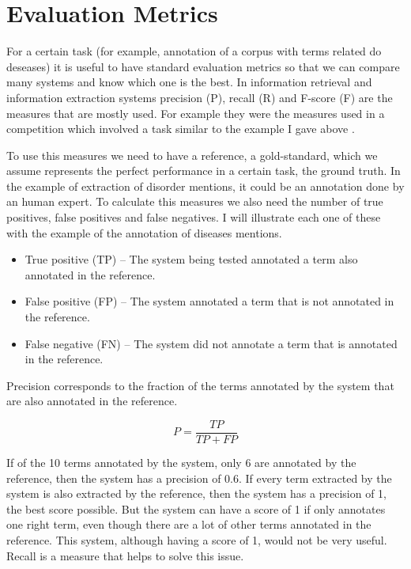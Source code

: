 \section{Evaluation Metrics}
\label{Evaluation Metrics}

For a certain task (for example, annotation of a corpus with terms related do deseases) it is useful to have standard evaluation metrics so that we can compare many systems and know which one is the best. In information retrieval and information extraction systems precision (P), recall (R) and F-score (F) are the measures that are mostly used. For example they were the measures used in a competition which involved a task similar to the example I gave above \citep{Elhadad2015}.

To use this measures we need to have a reference, a gold-standard, which we assume represents the perfect performance in a certain task, the ground truth. In the example of extraction of disorder mentions, it could be an annotation done by an human expert. To calculate this measures we also need the number of true positives, false positives and false negatives. I will illustrate each one of these with the example of the annotation of diseases mentions.

\begin{itemize}
\item True positive (TP) – The system being tested annotated a term also annotated in the reference.
\item False positive (FP) – The system annotated a term that is not annotated in the reference.
\item False negative (FN) – The system did not annotate a term that is annotated in the reference.
\end{itemize}

Precision corresponds to the fraction of the terms annotated by the system that are also annotated in the reference.

\begin{equation}
P = \frac{TP}{TP+FP}
\end{equation}

If of the 10 terms annotated by the system, only 6 are annotated by the reference, then the system has a precision of 0.6. If every term extracted by the system is also extracted by the reference, then the system has a precision of 1, the best score possible. But the system can have a score of 1 if only annotates one right term, even though there are a lot of other terms annotated in the reference. This system, although having a score of 1, would not be very useful. Recall is a measure that helps to solve this issue.

